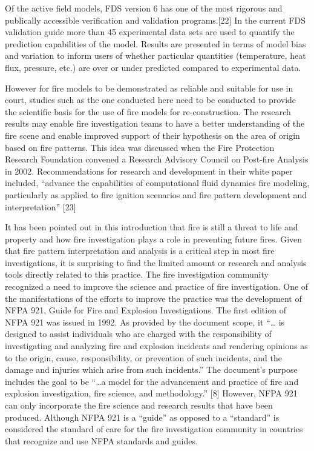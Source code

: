 \documentclass[twoside]{uocthesis}
\begin{document}
Of the active field models, FDS version 6 has one of the most rigorous and publically accessible verification and validation programs.[22] In the current FDS validation guide more than 45 experimental data sets are used to quantify the prediction capabilities of the model.  Results are presented in terms of model bias and variation to inform users of whether particular quantities (temperature, heat flux, pressure, etc.) are over or under predicted compared to experimental data. 

However for fire models to be demonstrated as reliable and suitable for use in court, studies such as the one conducted here need to be conducted to provide the scientific basis for the use of fire models for re-construction.  The research results may enable fire investigation teams to have a better understanding of the fire scene and enable improved support of their hypothesis on the area of origin based on fire patterns.  This idea was discussed when the Fire Protection Research Foundation convened a Research Advisory Council on Post-fire Analysis in 2002.  Recommendations for research and development in their white paper included, “advance the capabilities of computational fluid dynamics fire modeling, particularly as applied to fire ignition scenarios and fire pattern development and interpretation”  [23]

It has been pointed out in this introduction that fire is still a threat to life and property and how fire investigation plays a role in preventing future fires.  Given that fire pattern interpretation and analysis is a critical step in most fire investigations, it is surprising to find the limited amount or research and analysis tools directly related to this practice.  The fire investigation community recognized a need to improve the science and practice of fire investigation.  One of the manifestations of the efforts to improve the practice was the development of NFPA 921, Guide for Fire and Explosion Investigations.  The first edition of NFPA 921 was issued in 1992.  As provided by the document scope, it “… is designed to assist individuals who are charged with the responsibility of investigating and analyzing fire and explosion incidents and rendering opinions as to the origin, cause, responsibility, or prevention of such incidents, and the damage and injuries which arise from such incidents.”     The document’s purpose includes the goal to be “…a model for the advancement and practice of fire and explosion investigation, fire science, and methodology.” [8] However, NFPA 921 can only incorporate the fire science and research results that have been produced.  Although NFPA 921 is a “guide” as opposed to a “standard” is considered the standard of care for the fire investigation community in countries that recognize and use NFPA standards and guides.
\end{document}
